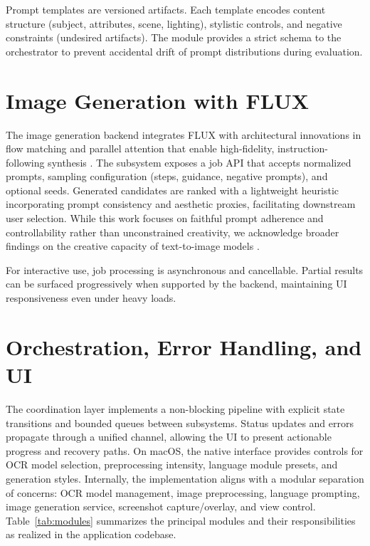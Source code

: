Prompt templates are versioned artifacts. Each template encodes content structure (subject, attributes, scene, lighting), stylistic controls, and negative constraints (undesired artifacts). The module provides a strict schema to the orchestrator to prevent accidental drift of prompt distributions during evaluation.

\section{Image Generation with FLUX}

The image generation backend integrates FLUX \cite{blackforestlabs2024flux} with architectural innovations in flow matching and parallel attention that enable high-fidelity, instruction-following synthesis \cite{rombach2025flux}. The subsystem exposes a job API that accepts normalized prompts, sampling configuration (steps, guidance, negative prompts), and optional seeds. Generated candidates are ranked with a lightweight heuristic incorporating prompt consistency and aesthetic proxies, facilitating downstream user selection. While this work focuses on faithful prompt adherence and controllability rather than unconstrained creativity, we acknowledge broader findings on the creative capacity of text-to-image models \cite{oppenlaender2022creativity}.

For interactive use, job processing is asynchronous and cancellable. Partial results can be surfaced progressively when supported by the backend, maintaining UI responsiveness even under heavy loads.

\section{Orchestration, Error Handling, and UI}

The coordination layer implements a non-blocking pipeline with explicit state transitions and bounded queues between subsystems. Status updates and errors propagate through a unified channel, allowing the UI to present actionable progress and recovery paths. On macOS, the native interface provides controls for OCR model selection, preprocessing intensity, language module presets, and generation styles. Internally, the implementation aligns with a modular separation of concerns: OCR model management, image preprocessing, language prompting, image generation service, screenshot capture/overlay, and view control. Table~\ref{tab:modules} summarizes the principal modules and their responsibilities as realized in the application codebase.

